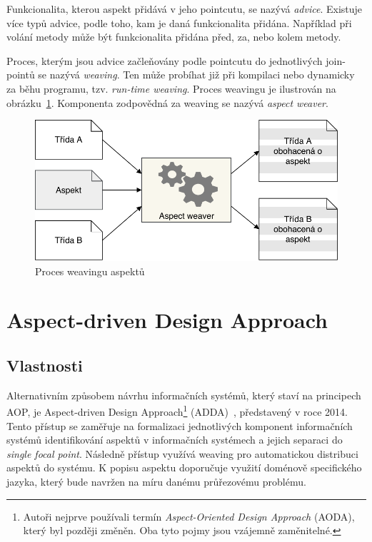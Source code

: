 Funkcionalita, kterou aspekt přidává v jeho pointcutu, se nazývá
\textit{advice}. Existuje více typů advice, podle toho, kam je
daná funkcionalita přidána. Například při volání metody může
být funkcionalita přidána před, za, nebo kolem metody.

Proces, kterým jsou advice začleňovány podle pointcutu do
jednotlivých join-pointů se nazývá \textit{weaving}. Ten může
probíhat již při kompilaci nebo dynamicky za běhu programu,
tzv. \textit{run-time weaving}. Proces weavingu je ilustrován
na obrázku~\ref{fig:aspect-weaving}. Komponenta zodpovědná za
weaving se nazývá \textit{aspect weaver}.

\begin{figure}[t]
    \centering
    \includegraphics[keepaspectratio=true, width=0.7\linewidth]{figures/aspect-weaving.pdf}
    \caption{Proces weavingu aspektů}
    \label{fig:aspect-weaving}
\end{figure}

\section{Aspect-driven Design Approach}

\subsection{Vlastnosti}

Alternativním způsobem návrhu informačních systémů, který staví na principech \gls{AOP},
je Aspect-driven Design Approach\footnote{Autoři nejprve používali termín \textit{Aspect-Oriented
Design Approach} (AODA), který byl později změněn. Oba tyto pojmy jsou vzájemně zaměnitelné.}
(\gls{ADDA})~\cite{cemus2014aspect}, představený v roce 2014.
Tento přístup se zaměřuje na formalizaci jednotlivých komponent informačních systémů identifikování aspektů
v informačních systémech a jejich separaci do \textit{single focal point}.
Následně přístup využívá weaving pro automatickou distribuci aspektů do systému.
K popisu aspektu doporučuje využití doménově specifického jazyka, který bude navržen na
míru danému průřezovému problému.

